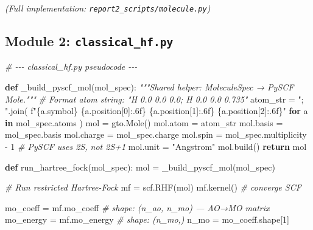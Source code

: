 \documentclass[
  11pt,
]{report}
\newenvironment{Shaded}{}{}
\newcommand{\CommentTok}[1]{\textcolor[rgb]{0.38,0.63,0.69}{\textit{#1}}}
\newcommand{\ControlFlowTok}[1]{\textcolor[rgb]{0.00,0.44,0.13}{\textbf{#1}}}
\newcommand{\DecValTok}[1]{\textcolor[rgb]{0.25,0.63,0.44}{#1}}
\newcommand{\KeywordTok}[1]{\textcolor[rgb]{0.00,0.44,0.13}{\textbf{#1}}}
\newcommand{\NormalTok}[1]{#1}
\newcommand{\OperatorTok}[1]{\textcolor[rgb]{0.40,0.40,0.40}{#1}}
\newcommand{\SpecialCharTok}[1]{\textcolor[rgb]{0.25,0.44,0.63}{#1}}
\newcommand{\SpecialStringTok}[1]{\textcolor[rgb]{0.73,0.40,0.53}{#1}}
\newcommand{\StringTok}[1]{\textcolor[rgb]{0.25,0.44,0.63}{#1}}
\begin{document}
\emph{(Full implementation: \texttt{report2\_scripts/molecule.py})}

\subsection{\texorpdfstring{Module 2:
\texttt{classical\_hf.py}}{Module 2: classical\_hf.py}}\label{module-2-classical_hf.py}

\begin{Shaded}
\begin{Highlighting}[]
\CommentTok{\# {-}{-}{-} classical\_hf.py pseudocode {-}{-}{-}}

\KeywordTok{def}\NormalTok{ \_build\_pyscf\_mol(mol\_spec):}
    \CommentTok{"""Shared helper: MoleculeSpec → PySCF Mole."""}
    \CommentTok{\# Format atom string: "H 0.0 0.0 0.0; H 0.0 0.0 0.735"}
\NormalTok{    atom\_str }\OperatorTok{=} \StringTok{"; "}\NormalTok{.join(}
        \SpecialStringTok{f"}\SpecialCharTok{\{}\NormalTok{a}\SpecialCharTok{.}\NormalTok{symbol}\SpecialCharTok{\}}\SpecialStringTok{ }\SpecialCharTok{\{}\NormalTok{a}\SpecialCharTok{.}\NormalTok{position[}\DecValTok{0}\NormalTok{]}\SpecialCharTok{:.6f\}}\SpecialStringTok{ }\SpecialCharTok{\{}\NormalTok{a}\SpecialCharTok{.}\NormalTok{position[}\DecValTok{1}\NormalTok{]}\SpecialCharTok{:.6f\}}\SpecialStringTok{ }\SpecialCharTok{\{}\NormalTok{a}\SpecialCharTok{.}\NormalTok{position[}\DecValTok{2}\NormalTok{]}\SpecialCharTok{:.6f\}}\SpecialStringTok{"}
        \ControlFlowTok{for}\NormalTok{ a }\KeywordTok{in}\NormalTok{ mol\_spec.atoms}
\NormalTok{    )}
\NormalTok{    mol }\OperatorTok{=}\NormalTok{ gto.Mole()}
\NormalTok{    mol.atom }\OperatorTok{=}\NormalTok{ atom\_str}
\NormalTok{    mol.basis }\OperatorTok{=}\NormalTok{ mol\_spec.basis}
\NormalTok{    mol.charge }\OperatorTok{=}\NormalTok{ mol\_spec.charge}
\NormalTok{    mol.spin }\OperatorTok{=}\NormalTok{ mol\_spec.multiplicity }\OperatorTok{{-}} \DecValTok{1}  \CommentTok{\# PySCF uses 2S, not 2S+1}
\NormalTok{    mol.unit }\OperatorTok{=} \StringTok{"Angstrom"}
\NormalTok{    mol.build()}
    \ControlFlowTok{return}\NormalTok{ mol}


\KeywordTok{def}\NormalTok{ run\_hartree\_fock(mol\_spec):}
\NormalTok{    mol }\OperatorTok{=}\NormalTok{ \_build\_pyscf\_mol(mol\_spec)}

    \CommentTok{\# Run restricted Hartree{-}Fock}
\NormalTok{    mf }\OperatorTok{=}\NormalTok{ scf.RHF(mol)}
\NormalTok{    mf.kernel()  }\CommentTok{\# converge SCF}

\NormalTok{    mo\_coeff }\OperatorTok{=}\NormalTok{ mf.mo\_coeff      }\CommentTok{\# shape: (n\_ao, n\_mo) — AO→MO matrix}
\NormalTok{    mo\_energy }\OperatorTok{=}\NormalTok{ mf.mo\_energy    }\CommentTok{\# shape: (n\_mo,)}
\NormalTok{    n\_mo }\OperatorTok{=}\NormalTok{ mo\_coeff.shape[}\DecValTok{1}\NormalTok{]}


\end{Highlighting}
\end{Shaded}
\end{document}
